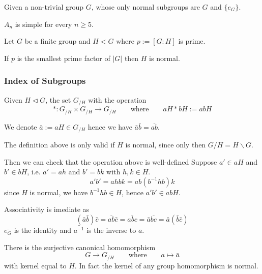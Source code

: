 \begin{definition}
   Given a non-trivial group \(G\), whose only normal subgroups are \(G\) and \(\{e_G\}\).
\end{definition}

\begin{proposition}
   \(A_n\) is simple for every \(n \geq 5\).
\end{proposition}

\begin{proposition}
   Let \(G\) be a finite group and \(H < G\) where \(p := [G:H]\) is prime.

   If \(p\) is the smallest prime factor of \(|G|\) then \(H\) is normal.
\end{proposition}

\subsubsection{Index of Subgroups}
\begin{definition}
   Given \(H \triangleleft G\), the set \(G_{/H}\) with the operation
   \[\ast: G_{/H} \times G_{/H} \to G_{/H} \qquad\text{where}\qquad aH \ast bH := abH\]
\end{definition}
\begin{remark}[Notation]
   We denote \(\bar{a} := aH \in G_{/H}\) hence we have \(\bar{a}\bar{b} = \overline{ab}\).
\end{remark}
\begin{remark}
   The definition above is only valid if \(H\) is normal, since only then \(G/H = H\backslash G\).

   Then we can check that the operation above is well-defined
   Suppose \(a' \in aH\) and \(b' \in bH\), i.e. \(a' = ah\) and \(b' = bk\) with \(h,k \in H\).
   \[a'b' = ahbk = ab(b^{-1}hb)k\]
   since \(H\) is normal, we have \(b^{-1}hb \in H\), hence \(a'b' \in abH\).

   Associativity is imediate as
   \[(\bar{a}\bar{b}) \bar{c} = \overline{ab}\bar{c} = \overline{abc} = \bar{a}\overline{bc} = \bar{a}(\bar{b}\bar{c})\]
   \(\bar{e_G}\) is the identity and \(\bar{a^{-1}}\) is the inverse to \(\bar{a}\).
\end{remark}

There is the surjective canonical homomorphism \[G \to G_{/H} \qquad\text{where}\qquad a \mapsto \bar{a}\]
with kernel equal to \(H\).
In fact the kernel of any group homomorphism is normal.


